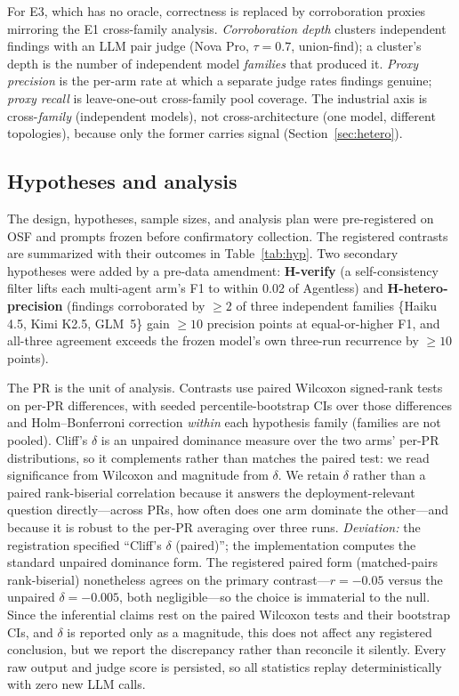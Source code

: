 \documentclass[conference]{IEEEtran}
\begin{document}
For E3, which has no oracle, correctness is replaced by corroboration proxies
mirroring the E1 cross-family analysis. \emph{Corroboration depth} clusters
independent findings with an LLM pair judge (Nova Pro, $\tau{=}0.7$, union-find);
a cluster's depth is the number of independent model \emph{families} that
produced it. \emph{Proxy precision} is the per-arm rate at which a separate judge
rates findings genuine; \emph{proxy recall} is leave-one-out cross-family pool
coverage. The industrial axis is cross-\emph{family} (independent models), not
cross-architecture (one model, different topologies), because only the former
carries signal (Section~\ref{sec:hetero}).

\subsection{Hypotheses and analysis}
The design, hypotheses, sample sizes, and analysis plan were pre-registered on
OSF and prompts frozen before confirmatory collection. The registered contrasts
are summarized with their outcomes in Table~\ref{tab:hyp}. Two secondary
hypotheses were added by a pre-data amendment: \textbf{H-verify} (a
self-consistency filter lifts each multi-agent arm's F1 to within 0.02 of
Agentless) and \textbf{H-hetero-precision} (findings corroborated by ${\geq}2$ of
three independent families \{Haiku 4.5, Kimi K2.5, GLM~5\} gain ${\geq}10$
precision points at equal-or-higher F1, and all-three agreement exceeds the
frozen model's own three-run recurrence by ${\geq}10$ points).

The PR is the unit of analysis. Contrasts use paired Wilcoxon signed-rank tests
on per-PR differences, with seeded percentile-bootstrap CIs over those
differences and Holm--Bonferroni correction \emph{within} each hypothesis family
(families are not pooled). Cliff's $\delta$ is an unpaired dominance measure over
the two arms' per-PR distributions, so it complements rather than matches the
paired test: we read significance from Wilcoxon and magnitude from $\delta$. We
retain $\delta$ rather than a paired rank-biserial correlation because it answers
the deployment-relevant question directly---across PRs, how often does one arm
dominate the other---and because it is robust to the per-PR averaging over three
runs. \emph{Deviation:} the registration specified ``Cliff's $\delta$ (paired)'';
the implementation computes the standard unpaired dominance form. The registered
paired form (matched-pairs rank-biserial) nonetheless agrees on the primary
contrast---$r{=}{-}0.05$ versus the unpaired $\delta{=}{-}0.005$, both
negligible---so the choice is immaterial to the null. Since the
inferential claims rest on the paired Wilcoxon tests and their bootstrap CIs, and
$\delta$ is reported only as a magnitude, this does not affect any registered
conclusion, but we report the discrepancy rather than reconcile it silently. Every raw output and judge score is
persisted, so all statistics replay deterministically with zero new LLM calls.
\end{document}
